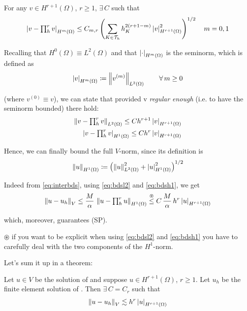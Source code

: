 \begin{theorem}
For any $v\in H^{r+1}(\Omega)$, $r\geq 1$, $\exists\,C$ such that
\begin{equation*}
\left\lvert v-\textstyle\prod_h^r v \right\rvert_{H^m(\Omega)}\leq C_{m,r} \left( \sum_{K\in\mathcal{T}_h} h_K^{2(r+1-m)}\left\lvert v \right\rvert^2_{H^{r+1}(\Omega)} \right)^{1/2}\quad m=0,1
\end{equation*}

Recalling that $H^0(\Omega)\equiv L^2(\Omega)$ and that $\left\lvert \cdot \right\rvert_{H^m(\Omega)}$ is the seminorm, which is defined as
\begin{equation*}
\left\lvert v \right\rvert_{H^m(\Omega)}\coloneq \left\lVert v^{(m)} \right\rVert_{L^2(\Omega)}\qquad \forall\, m\geq 0
\end{equation*}

(where $v^{(0)}\equiv v$), we can state that provided v \emph{regular enough} (i.e. to have the seminorm bounded) there hold:
\begin{align}
\label{eq:bdsl2}
\left\lVert v-\textstyle\prod_h^r v \right\rVert_{L^2(\Omega)}\leq C h^{r+1} \left\lvert v \right\rvert_{H^{r+1}(\Omega)}
\\
\label{eq:bdsh1}
\left\lvert v-\textstyle\prod_h^r v \right\rvert_{H^1(\Omega)}\leq C h^r \left\lvert v \right\rvert_{H^{r+1}(\Omega)}
\end{align}
\end{theorem}\vspace{-0.3cm}

Hence, we can finally bound the full $V$-norm, since its definition is
\begin{equation*}
\left\lVert u \right\rVert_{H^1(\Omega)}\coloneq \left( \left\lVert u \right\rVert_{L^2(\Omega)}^2+ \left\lvert u \right\rvert_{H^1(\Omega)}^2 \right)^{1/2}
\end{equation*}

Indeed from \eqref{eq:interbds}, using \eqref{eq:bdsl2} and \eqref{eq:bdsh1}, we get
\begin{equation*}
\left\lVert u-u_h \right\rVert_V\leq \frac{M}{\alpha} \,\left\lVert u-\textstyle\prod_h^r u \right\rVert_{H^1(\Omega)} \overset{\circledast}{\leq} C\,\frac{M}{\alpha}\,h^{r}\left\lvert u \right\rvert_{H^{r+1}(\Omega)} 
\end{equation*}

which, moreover, guarantees (SP).

\smallskip

$\circledast$ if you want to be explicit when using \eqref{eq:bdsl2} and \eqref{eq:bdsh1} you have to carefully deal with the two components of the $H^1$-norm.

\newpage

Let's sum it up in a theorem:
\begin{theorem}
Let $u\in V$ be the solution of {} and suppose $u\in H^{r+1}(\Omega)$, $r\geq 1$. Let $u_h$ be the finite element solution of {}. Then $\exists\,C=C_r$ such that
\begin{equation}
\label{eq:finalH1bds}
\left\lVert u-u_h \right\rVert_V\lesssim h^r\left\lvert u \right\rvert_{H^{r+1}(\Omega)}
\end{equation} 
\end{theorem}\vspace{-0.2cm}

